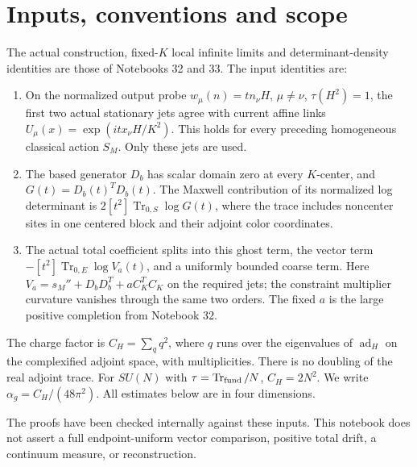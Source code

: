 \documentclass[11pt]{article}
\theoremstyle{remark}
\begin{document}
\section*{Inputs, conventions and scope}

The actual construction, fixed-\(K\) local infinite limits
and determinant-density identities are those of Notebooks
32 and 33. The input identities are:
\begin{enumerate}
\item On the normalized output probe
\(w_\mu(n)=t n_\nu H\), \(\mu\ne\nu\), \(\tau(H^2)=1\),
the first two actual stationary jets agree with current
affine links \(U_\mu(x)=\exp(i t x_\nu H/K^2)\).
This holds for every preceding homogeneous classical
action \(S_M\). Only these jets are used.
\item The based generator \(D_b\) has scalar domain zero
at every \(K\)-center, and \(G(t)=D_b(t)^TD_b(t)\).
The Maxwell contribution of its normalized log determinant
is \(2[t^2]\operatorname{Tr}_{0,S}\log G(t)\), where the
trace includes noncenter sites in one centered block
and their adjoint color coordinates.
\item The actual total coefficient splits into this ghost
term, the vector term
\(-[t^2]\operatorname{Tr}_{0,E}\log V_a(t)\), and a
uniformly bounded coarse term. Here
\(V_a=s_M''+D_bD_b^T+aC_K^TC_K\) on the required jets;
the constraint multiplier curvature vanishes through
the same two orders. The fixed \(a\) is the large
positive completion from Notebook 32.
\end{enumerate}

The charge factor is \(C_H=\sum_q q^2\), where \(q\)
runs over the eigenvalues of \(\operatorname{ad}_H\)
on the complexified adjoint space, with multiplicities.
There is no doubling of the real adjoint trace.
For \(SU(N)\) with \(\tau=\operatorname{Tr}_{\rm fund}/N\),
\(C_H=2N^2\). We write \(\alpha_g=C_H/(48\pi^2)\).
All estimates below are in four dimensions.

The proofs have been checked internally against these
inputs. This notebook does not assert a full
endpoint-uniform vector comparison, positive total
drift, a continuum measure, or reconstruction.
\end{document}
